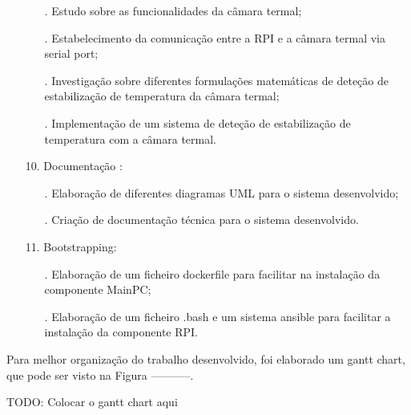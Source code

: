 \begin{itemize}
\begin{itemize}
            \item[.] Estudo sobre as funcionalidades da câmara termal;
            \item[.] Estabelecimento da comunicação entre a RPI e a câmara termal via serial port;
            \item[.] Investigação sobre diferentes formulações matemáticas de deteção de estabilização de temperatura da câmara termal;
            \item[.] Implementação de um sistema de deteção de estabilização de temperatura com a câmara termal.
        \end{itemize}
    \item[] 10. Documentação :
        \begin{itemize}
            \item[.] Elaboração de diferentes diagramas UML para o sistema desenvolvido;
            \item[.] Criação de documentação técnica para o sistema desenvolvido.
        \end{itemize}
    \item[] 11. Bootstrapping:
        \begin{itemize}
            \item[.] Elaboração de um ficheiro dockerfile para facilitar na instalação da componente MainPC;
            \item[.] Elaboração de um ficheiro .bash e um sistema ansible para facilitar a instalação da componente RPI.
        \end{itemize}
\end{itemize}

Para melhor organização do trabalho desenvolvido, foi elaborado um gantt chart, que pode ser visto na Figura -----------.

TODO: Colocar o gantt chart aqui